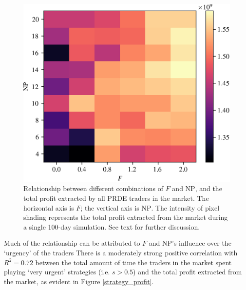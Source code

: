 \documentclass[conference]{IEEEtran}
\begin{document}
\begin{figure}[htbp]
    \centerline{\includegraphics[width=\columnwidth]{profit_grid.png}}
    \caption{
        Relationship between different combinations of $F$ and $\mathrm{NP}$, and the total profit extracted by all PRDE traders in the market.
        The horizontal axis is $F$; the vertical axis is $\mathrm{NP}$.
        The intensity of pixel shading represents the total profit extracted from the market during a single 100-day simulation.
        See text for further discussion.
    }
    \label{profit_grid}
\end{figure}

Much of the relationship can be attributed to $F$ and $\mathrm{NP}$'s influence over the `urgency' of the traders
There is a moderately strong positive correlation with $R^2=0.72$ between the total amount of time the traders in the market spent playing `very urgent' strategies (i.e. $s>0.5$) and the total profit extracted from the market, as evident in Figure \ref{strategy_profit}.
\end{document}
